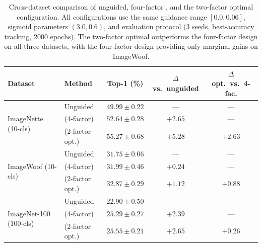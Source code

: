 \begin{table}[t]
\centering
\caption{Cross-dataset comparison of unguided, four-factor \cags{}, and the two-factor optimal configuration. All configurations use the same guidance range $[0.0, 0.06]$, sigmoid parameters $(3.0, 0.6)$, and evaluation protocol (3 seeds, best-accuracy tracking, 2000 epochs). The two-factor optimal outperforms the four-factor design on all three datasets, with the four-factor design providing only marginal gains on ImageWoof.}
\label{tab:cross-dataset-config}
\begin{tabular}{llccc}
\toprule
\textbf{Dataset} & \textbf{Method} & \textbf{Top-1 (\%)} & \textbf{$\Delta$ vs.\ unguided} & \textbf{$\Delta$ opt.\ vs.\ 4-fac.} \\
\midrule
\multirow{3}{*}{ImageNette (10-cls)} & Unguided & $49.99 \pm 0.22$ & --- & --- \\
 & \cags{} (4-factor) & $52.64 \pm 0.28$ & $+2.65$ & --- \\
 & \cags{} (2-factor opt.) & $\mathbf{55.27 \pm 0.68}$ & $\mathbf{+5.28}$ & $+2.63$ \\
\midrule
\multirow{3}{*}{ImageWoof (10-cls)} & Unguided & $31.75 \pm 0.06$ & --- & --- \\
 & \cags{} (4-factor) & $31.99 \pm 0.46$ & $+0.24$ & --- \\
 & \cags{} (2-factor opt.) & $\mathbf{32.87 \pm 0.29}$ & $\mathbf{+1.12}$ & $+0.88$ \\
\midrule
\multirow{3}{*}{ImageNet-100 (100-cls)} & Unguided & $22.90 \pm 0.50$ & --- & --- \\
 & \cags{} (4-factor) & $25.29 \pm 0.27$ & $+2.39$ & --- \\
 & \cags{} (2-factor opt.) & $\mathbf{25.55 \pm 0.21}$ & $\mathbf{+2.65}$ & $+0.26$ \\
\bottomrule
\end{tabular}
\end{table}

